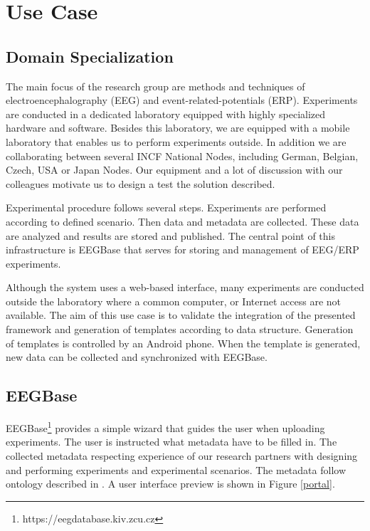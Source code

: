 \documentclass[conference]{IEEEtran}
\begin{document}
\section{Use Case}

\subsection{Domain Specialization}

The main focus of the research group are methods and techniques of electroencephalography (EEG) and event-related-potentials (ERP). Experiments are conducted in a dedicated laboratory equipped with highly specialized hardware and software. Besides this laboratory, we are equipped with a mobile laboratory that enables us to perform experiments outside. In addition we are collaborating between several INCF National Nodes, including German, Belgian, Czech, USA or Japan Nodes. Our equipment and a lot of discussion with our colleagues motivate us to design a test the solution described.

Experimental procedure follows several steps.  Experiments are performed according to defined scenario. Then data and metadata are collected. These data are analyzed and results are stored and published. The central point of this infrastructure is EEGBase \cite{DBLP:conf/biostec/JezekSBM13} that serves for storing and management of EEG/ERP experiments.

Although the system uses a web-based interface, many experiments are conducted outside the laboratory where a common computer, or Internet access are not available. The aim of this use case is to validate the integration of the presented framework and generation of templates according to data structure. Generation of templates is controlled by an Android phone. When the template is generated, new data can be collected and synchronized with EEGBase.

\subsection{EEGBase} \label{Portal}



EEGBase\footnote{https://eegdatabase.kiv.zcu.cz} provides a simple wizard that guides the user when uploading experiments. The user is instructed what metadata have to be filled in. The collected metadata respecting experience of our research partners with designing and performing experiments and experimental scenarios. The metadata follow ontology described in \cite{BMEI_jezek_moucek}. A user interface preview is shown in Figure \ref{portal}.
\end{document}
